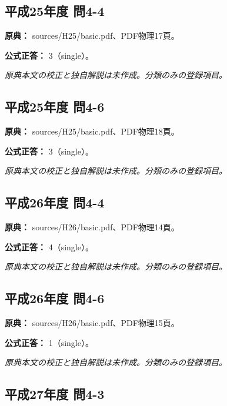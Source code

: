 \subsection{平成25年度 問4-4}
\label{q:h25-reg-basic-4-4}

\noindent\textbf{原典：} sources/H25/basic.pdf、PDF物理17頁。

\textbf{公式正答：} 3（single）。

\par\textit{原典本文の校正と独自解説は未作成。分類のみの登録項目。}

\subsection{平成25年度 問4-6}
\label{q:h25-reg-basic-4-6}

\noindent\textbf{原典：} sources/H25/basic.pdf、PDF物理18頁。

\textbf{公式正答：} 3（single）。

\par\textit{原典本文の校正と独自解説は未作成。分類のみの登録項目。}

\subsection{平成26年度 問4-4}
\label{q:h26-reg-basic-4-4}

\noindent\textbf{原典：} sources/H26/basic.pdf、PDF物理14頁。

\textbf{公式正答：} 4（single）。

\par\textit{原典本文の校正と独自解説は未作成。分類のみの登録項目。}

\subsection{平成26年度 問4-6}
\label{q:h26-reg-basic-4-6}

\noindent\textbf{原典：} sources/H26/basic.pdf、PDF物理15頁。

\textbf{公式正答：} 1（single）。

\par\textit{原典本文の校正と独自解説は未作成。分類のみの登録項目。}

\subsection{平成27年度 問4-3}
\label{q:h27-reg-basic-4-3}

